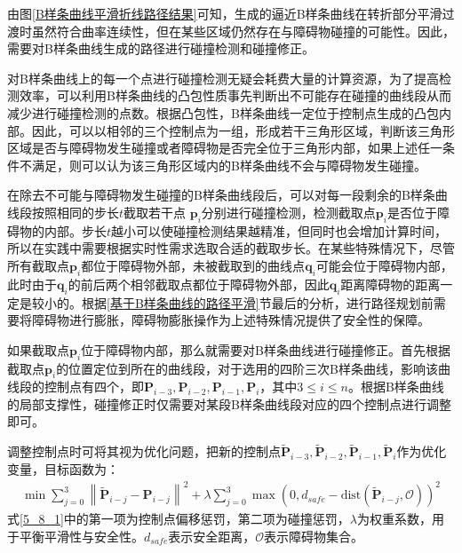 由图\ref{B样条曲线平滑折线路径结果}可知，生成的逼近B样条曲线在转折部分平滑过渡时虽然符合曲率连续性，但在某些区域仍然存在与障碍物碰撞的可能性。因此，需要对B样条曲线生成的路径进行碰撞检测和碰撞修正。

对B样条曲线上的每一个点进行碰撞检测无疑会耗费大量的计算资源，为了提高检测效率，可以利用B样条曲线的凸包性质事先判断出不可能存在碰撞的曲线段从而减少进行碰撞检测的点数。根据凸包性，B样条曲线一定位于控制点生成的凸包内部。因此，可以以相邻的三个控制点为一组，形成若干三角形区域，判断该三角形区域是否与障碍物发生碰撞或者障碍物是否完全位于三角形内部，如果上述任一条件不满足，则可以认为该三角形区域内的B样条曲线不会与障碍物发生碰撞。

在除去不可能与障碍物发生碰撞的B样条曲线段后，可以对每一段剩余的B样条曲线段按照相同的步长$t$截取若干点
$\boldsymbol{p}_i$分别进行碰撞检测，检测截取点$\boldsymbol{p}_i$是否位于障碍物的内部。步长$t$越小可以使碰撞检测结果越精准，但同时也会增加计算时间，所以在实践中需要根据实时性需求选取合适的截取步长。在某些特殊情况下，尽管所有截取点$\boldsymbol{p}_i$都位于障碍物外部，未被截取到的曲线点$\boldsymbol{q}_i$可能会位于障碍物内部，此时由于$\boldsymbol{q}_i$的前后两个相邻截取点都位于障碍物外部，因此$\boldsymbol{q}_i$距离障碍物的距离一定是较小的。根据\ref{基于B样条曲线的路径平滑}节最后的分析，进行路径规划前需要将障碍物进行膨胀，障碍物膨胀操作为上述特殊情况提供了安全性的保障。

如果截取点$\boldsymbol{p}_i$位于障碍物内部，那么就需要对B样条曲线进行碰撞修正。首先根据截取点$\boldsymbol{p}_i$的位置定位到所在的曲线段，对于选用的四阶三次B样条曲线，影响该曲线段的控制点有四个，即$\boldsymbol{P}_{i-3},\boldsymbol{P}_{i-2},\boldsymbol{P}_{i-1},\boldsymbol{P}_{i}$，其中$3\leqslant i \leqslant n$。根据B样条曲线的局部支撑性，碰撞修正时仅需要对某段B样条曲线段对应的四个控制点进行调整即可。


调整控制点时可将其视为优化问题，把新的控制点$\widetilde {\boldsymbol{P}}_{i-3},\widetilde {\boldsymbol{P}}_{i-2},\widetilde {\boldsymbol{P}}_{i-1},\widetilde {\boldsymbol{P}}_{i}$作为优化变量，目标函数为：
\begin{equation}
    \begin{aligned}
        \min \sum_{j=0}^{3}\left\|\widetilde{\boldsymbol{P}}_{i-j}-\boldsymbol{P}_{i-j}\right\|^2 + \lambda\sum_{j=0}^{3}\max(0, d_{safe} - \text{dist}(\widetilde{\boldsymbol{P}}_{i-j},\mathcal{O}))^2
    \end{aligned}
    \label{5_8_1}
\end{equation}
式\eqref{5_8_1}中的第一项为控制点偏移惩罚，第二项为碰撞惩罚，$\lambda$为权重系数，用于平衡平滑性与安全性。$d_{safe}$表示安全距离，$\mathcal{O}$表示障碍物集合。

